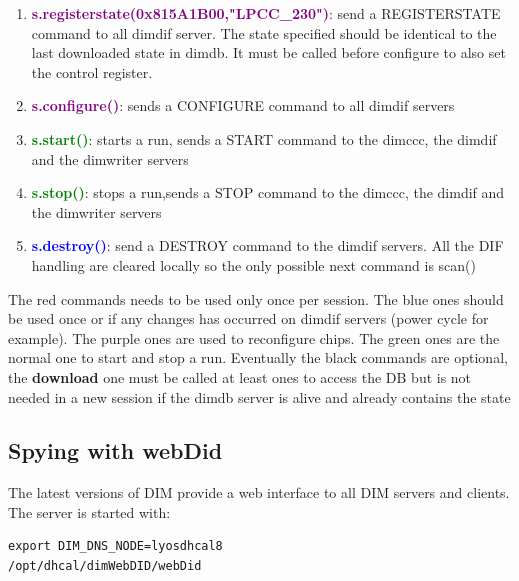 \documentclass[english]{article}
\begin{document}
\begin{enumerate}
\item \textcolor{purple}{\bf s.registerstate(0x815A1B00,"LPCC\_230")}: send a REGISTERSTATE command to all dimdif server. The state specified should be identical to the last downloaded state in dimdb. It must be called before configure to also set the control register.

\item \textcolor{purple}{\bf s.configure()}: sends a CONFIGURE command to all dimdif servers




\item \textcolor{green}{\bf s.start()}: starts a run, sends a START command to the dimccc, the dimdif and the dimwriter servers 

\item \textcolor{green}{\bf s.stop()}: stops a run,sends a STOP command to the dimccc, the dimdif and the dimwriter servers
\item \textcolor{blue}{\bf s.destroy()}: send a DESTROY command to the dimdif servers. All the DIF handling are cleared locally so the only possible next command is scan()
\end{enumerate} 

The red commands needs to be used only once per session. The blue ones should be used once or if any changes has occurred on dimdif servers (power cycle for example). The purple ones are used to reconfigure chips. The green ones are the normal one to start and stop a run. Eventually the black commands are optional, the {\bf download} one must be called at least ones to access the DB but is not needed in a new session if the dimdb server is alive and already contains the state 


\subsection{Spying with webDid}
The latest versions of DIM provide a web interface to all DIM servers and clients. The server is started with:
\begin{verbatim}
export DIM_DNS_NODE=lyosdhcal8
/opt/dhcal/dimWebDID/webDid
\end{verbatim}
\end{document}

